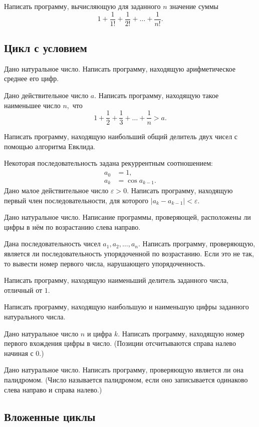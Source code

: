 \task Написать программу, вычисляющую для заданного $n$ значение суммы
\[
1+\frac1{1!} + \frac{1}{2!} + \ldots + \frac1{n!}.
\]

\subsection{Цикл с условием}

\task Дано натуральное число. Написать программу, находящую
арифметическое среднее его цифр.

\task Дано действительное число $a.$ Написать программу, находящую
такое наименьшее число $n,$ что
\[
1 + \frac12 + \frac13 + \ldots + \frac1n > a.
\]

\task Написать программу, находящую наибольший общий делитель двух
чисел с помощью алгоритма Евклида.

\task Некоторая последовательность задана рекуррентным соотношением:
\begin{align*}
  a_0 &= 1,\\
  a_k &= \cos a_{k-1}.
\end{align*}
Дано малое действительное число $\varepsilon > 0$. Написать программу, находящую первый член последовательности, для которого $|a_k - a_{k-1}| < \varepsilon.$

\task Дано натуральное число. Написание программы, проверяющей,
расположены ли цифры в нём по возрастанию слева направо.

\task Дана последовательность чисел $a_1, a_2, \ldots, a_n.$ Написать
программу, проверяющую, является ли последовательность упорядоченной
по возрастанию. Если это не так, то вывести номер первого числа,
нарушающего упорядоченность.

\task Написать программу, находящую наименьший делитель заданного
числа, отличный от $1.$

\task Написать программу, находящую наибольшую и наименьшую цифры
заданного натурального числа.

\task Дано натуральное число $n$ и цифра $k.$ Написать программу,
находящую номер первого вхождения цифры в число. (Позиции
отсчитываются справа налево начиная с 0.)

\task Дано натуральное число. Написать программу, проверяющую является
ли она палидромом. (Число называется палидромом, если оно записывается
одинаково слева направо и справа налево.)

\subsection{Вложенные циклы}

